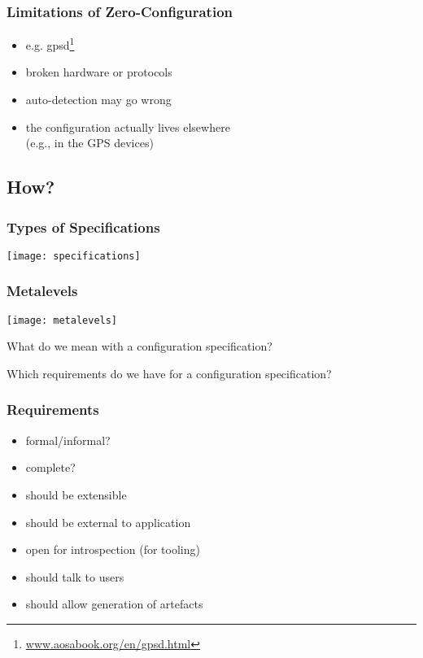 \begin{frame}
	\frametitle{Limitations of Zero-Configuration}
	\begin{itemize}
	\item e.g. gpsd\footnote{\url{www.aosabook.org/en/gpsd.html}}
	\pause
	\item broken hardware or protocols
	\item auto-detection may go wrong
	\item the configuration actually lives elsewhere \\ (e.g., in the GPS devices)
	\end{itemize}
\end{frame}

\subsection{How?}

\begin{frame}
	\frametitle{Types of Specifications}
	\texttt{[image: specifications]}
\end{frame}

\begin{frame}
	\frametitle{Metalevels}
	\texttt{[image: metalevels]}
\end{frame}

\begin{assignment}
	\begin{task}
	What do we mean with a configuration specification?
	\end{task}

	\begin{task}
	Which requirements do we have for a configuration specification?
	\end{task}
\end{assignment}


\begin{frame}
	\frametitle{Requirements}

	\begin{itemize}
	\item formal/informal?
	\item complete?
	\pause
	\item should be extensible
	\item should be external to application
	\item open for introspection (for tooling)
	\item should talk to users
	\item should allow generation of artefacts
	\end{itemize}
\end{frame}


